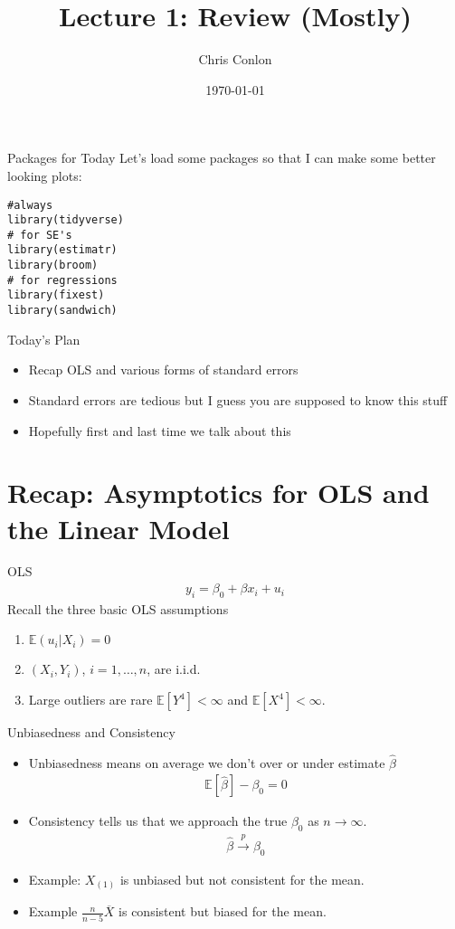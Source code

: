 \documentclass[aspectratio=169]{beamer}
\title{Lecture 1: Review (Mostly)}
\author{Chris Conlon }
\institute{NYU Stern }
\date{\today}
\newcommand{\E}{\mathbb{E}}
\begin{document}
\maketitle

\begin{frame}[fragile]{Packages for Today}
Let's load some packages so that I can make some better looking plots:\\
\begin{verbatim}
#always
library(tidyverse)
# for SE's
library(estimatr)
library(broom)
# for regressions
library(fixest)
library(sandwich)
\end{verbatim}
\end{frame}


\begin{frame}{Today's Plan}
\begin{itemize}
\item Recap OLS and various forms of standard errors
\item Standard errors are tedious but I guess you are supposed to know this stuff
\item Hopefully first and last time we talk about this
\end{itemize}
\end{frame}


\section{Recap: Asymptotics for OLS and the Linear Model}


\begin{frame}{OLS}
\begin{align*}
y_i = \beta_0 + \beta x_i + u_i
\end{align*}
Recall the three basic OLS assumptions
\begin{enumerate}
\item $\mathbb{E}(u_i |X_i ) = 0$
\item $(X_i,Y_i)$, $i =1,\ldots,n$, are i.i.d.
\item Large outliers are rare $\mathbb{E}[Y^4]< \infty$ and $\mathbb{E}[X^4]<\infty$.
\end{enumerate}
\end{frame}

\begin{frame}{Unbiasedness and Consistency}
\begin{itemize}
\item Unbiasedness means on average we don't over or under estimate $\widehat{\beta}$
\begin{align*}
\E[\widehat{\beta} ] - \beta_0 = 0
\end{align*}
\item Consistency tells us that we approach the true $\beta_0$ as $n \rightarrow \infty$.
\begin{align*}
\widehat{\beta}  \overset{p}{\to} \beta_0
\end{align*}
\item Example: $X_{(1)}$ is unbiased but not consistent for the mean.
\item Example $\frac{n}{n-5} \overline{X}$ is consistent but biased for the mean.
\end{itemize}
\end{frame}
\end{document}
